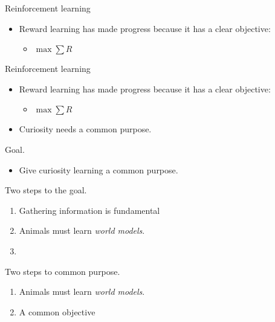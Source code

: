 \documentclass[10pt]{beamer}
\begin{document}
\begin{frame}[fragile]{Reinforcement learning}
\begin{itemize}
    \item Reward learning has made progress because it has a clear objective:
    \begin{itemize}
        \item $ \max \sum R$
    \end{itemize}
\end{itemize}
\end{frame}

\begin{frame}[fragile]{Reinforcement learning}
\begin{itemize}
    \item Reward learning has made progress because it has a clear objective:
    \begin{itemize}
        \item $ \max \sum R$
    \end{itemize}
    \item Curiosity needs a common purpose.
\end{itemize}
\end{frame}

\begin{frame}[fragile]{Goal.}
\begin{itemize}
\item Give curiosity learning a common purpose.
\end{itemize}
\end{frame}

\begin{frame}[fragile]{Two steps to the goal.}
\begin{enumerate}
    \item Gathering information is fundamental
    \item Animals must learn \textit{world models}.
    \item %
\end{enumerate}
\end{frame}

\begin{frame}[fragile]{Two steps to common purpose.}
\begin{enumerate}
    \item Animals must learn \textit{world models}.
    \item A common objective
\end{enumerate}
\end{frame}
\end{document}
